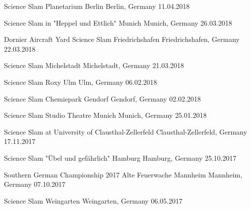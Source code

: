 \begin{cvhonors}
\cvhonor
{Science Slam Planetarium Berlin} %
{Berlin, Germany} %
{} %
{11.04.2018} %

\cvhonor
{Science Slam in "Heppel und Ettlich" Munich} %
{Munich, Germany} %
{} %
{26.03.2018} %

\cvhonor
{Dornier Aircraft Yard Science Slam Friedrichshafen} %
{Friedrichshafen, Germany} %
{} %
{22.03.2018} %

\cvhonor
{Science Slam Michelstadt} %
{Michelstadt, Germany} %
{} %
{21.03.2018} %

\cvhonor
{Science Slam Roxy Ulm} %
{Ulm, Germany} %
{} %
{06.02.2018} %

\cvhonor
{Science Slam Chemiepark Gendorf} %
{Gendorf, Germany} %
{} %
{02.02.2018} %

\cvhonor
{Science Slam Studio Theatre Munich} %
{Munich, Germany} %
{} %
{25.01.2018} %

\cvhonor
{Science Slam at University of Clausthal-Zellerfeld} %
{Clausthal-Zellerfeld, Germany} %
{} %
{17.11.2017} %

\cvhonor
{Science Slam "Übel und gefährlich" Hamburg} %
{Hamburg, Germany} %
{} %
{25.10.2017} %

\cvhonor
{Southern German Championship 2017 Alte Feuerwache Mannheim} %
{Mannheim, Germany} %
{} %
{07.10.2017} %

\cvhonor
{Science Slam Weingarten} %
{Weingarten, Germany} %
{} %
{06.05.2017} %


\end{cvhonors}
